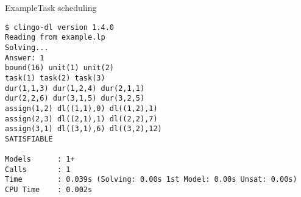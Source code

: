 \begin{frame}[fragile]{Example}{Task scheduling}
\begin{adjustbox}{max totalsize={\textwidth}{.83\textheight},keepaspectratio}
\begin{lstlisting}
$ clingo-dl version 1.4.0
Reading from example.lp
Solving...
Answer: 1
bound(16) unit(1) unit(2)
task(1) task(2) task(3)
dur(1,1,3) dur(1,2,4) dur(2,1,1)
dur(2,2,6) dur(3,1,5) dur(3,2,5)
assign(1,2) dl((1,1),0) dl((1,2),1)
assign(2,3) dl((2,1),1) dl((2,2),7)
assign(3,1) dl((3,1),6) dl((3,2),12)
SATISFIABLE

Models      : 1+
Calls       : 1
Time        : 0.039s (Solving: 0.00s 1st Model: 0.00s Unsat: 0.00s)
CPU Time    : 0.002s
\end{lstlisting}
\end{adjustbox}
\end{frame}
%
